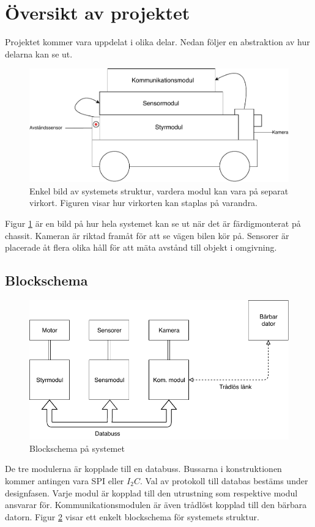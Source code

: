\documentclass[systemskiss/skiss.tex]{subfiles}
\begin{document}
\section{Översikt av projektet}
Projektet kommer vara uppdelat i olika delar. Nedan följer en abstraktion av
hur delarna kan se ut.

\begin{figure}[h]
    \centering
    \includegraphics[width=0.6\linewidth]{systemskiss/figures/taxibilen.pdf}
    \caption{Enkel bild av systemets struktur, vardera modul kan vara på
separat virkort. Figuren visar hur virkorten kan staplas på varandra.}
    \label{fig:taxiskiss}
\end{figure}
\noindent
Figur \ref{fig:taxiskiss} är en bild på hur hela systemet kan se ut när det är
färdigmonterat på chassit. Kameran är riktad framåt för att se vägen bilen kör
på. Sensorer är placerade åt flera olika håll för att mäta avstånd till objekt
i omgivning.

\subsection{Blockschema}

\begin{figure}[h]
    \centering
    \includegraphics[width=0.6\linewidth]{systemskiss/figures/blockskiss.pdf}
    \caption{Blockschema på systemet}
    \label{fig:blockskiss}
\end{figure}
\noindent
De tre modulerna är kopplade till en databuss. Bussarna i konstruktionen kommer
antingen vara SPI eller $I_{2}C$. Val av protokoll till databas bestäms under designfasen.
Varje modul är kopplad till den utrustning som respektive modul ansvarar för. Kommunikationsmodulen är även trådlöst kopplad till den bärbara datorn. Figur \ref{fig:blockskiss} visar ett enkelt blockschema för systemets struktur.
 
\end{document}
